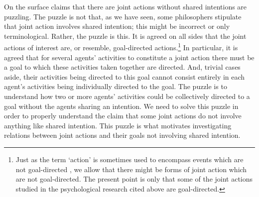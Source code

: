 \documentclass[12pt,a4paper]{extarticle}
\begin{document}
On the surface claims that there are joint actions without shared intentions are puzzling.  
The puzzle is not that, as we have seen, some philosophers stipulate that joint action involves shared intention; this might be incorrect or  only terminological.
Rather, the puzzle is this.
It is agreed on all sides that the joint actions of interest are, or resemble, goal-directed actions.\footnote{
Just as the term `action' is sometimes used to encompass events which are not goal-directed \citep[e.g.][]{Hursthouse:1991rd}, 
we allow that there might be forms of joint action which are not goal-directed.
The present point is only that some of the joint actions studied in the psychological research cited above are goal-directed.
}
In particular, it is agreed that for several agents' activities to constitute a joint action there must be a goal to which these activities taken together are directed.
And, trivial cases aside, their activities being directed to this goal cannot consist entirely in each agent's activities being individually directed to the goal.
The puzzle is to understand how two or more agents' activities could be collectively directed to a goal without the agents sharing an intention.
We need to solve this puzzle in order to properly understand the claim that some joint actions do not involve anything like shared intention.  
This puzzle is what motivates investigating relations between joint actions and their goals not involving shared intention.

\end{document}

